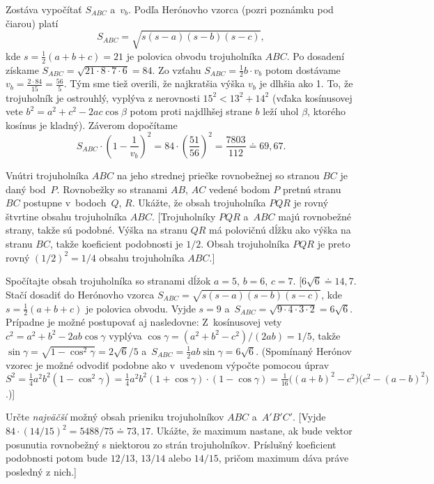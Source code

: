 {Zostáva vypočítať $S_{ABC}$ a~$v_b$.
Podľa Herónovho vzorca (pozri poznámku pod čiarou)
platí
$$S_{ABC}=\sqrt{s(s-a)(s-b)(s-c)},
$$
kde $s=\frac12(a+b+c)=21$ je polovica obvodu trojuholníka $ABC$.
Po dosadení získame
$S_{ABC}=\sqrt{21\cdot8\cdot7\cdot6}=84$.
Zo vzťahu $S_{ABC}=\frac12b\cdot v_b$ potom dostávame $v_b=\frac{2\cdot 84}{15}=\frac{56}{5}$.
Tým sme tiež overili, že najkratšia výška $v_b$ je dlhšia ako 1. To, že trojuholník je ostrouhlý, vyplýva z nerovnosti $15^2<13^2+14^2$ (vďaka kosínusovej vete $b^2=a^2+c^2-2ac\cos\beta$ potom proti najdlhšej strane $b$ leží uhol $\beta$, ktorého kosínus je kladný).
Záverom dopočítame
$$
S_{ABC}\cdot \left(1-\frac1{v_b}\right)^2 = 84\cdot \left(\frac{51}{56}\right)^2 = \frac{7803}{112} \doteq 69{,}67.
$$


Vnútri trojuholníka $ABC$ na jeho strednej priečke rovnobežnej so stranou $BC$ je daný bod~$P$. Rovnobežky so stranami $AB$, $AC$ vedené bodom $P$ pretnú stranu~$BC$ postupne v~bodoch~$Q$, $R$. Ukážte, že obsah trojuholníka $PQR$ je rovný štvrtine obsahu trojuholníka $ABC$.
 [Trojuholníky $PQR$ a~$ABC$ majú rovnobežné strany, takže sú podobné. Výška na stranu $QR$ má polovičnú dĺžku ako výška na stranu $BC$, takže koeficient podobnosti je $1/2$. Obsah trojuholníka $PQR$ je preto rovný $(1/2)^2=1/4$ obsahu trojuholníka $ABC$.]

Spočítajte obsah trojuholníka so stranami dĺžok $a=5$, $b=6$, $c=7$.
 [$6\sqrt6\doteq 14{,}7$. Stačí dosadiť do Herónovho vzorca
 $S_{ABC}=\sqrt{s(s-a)(s-b)(s-c)}$, kde $s=\frac12{(a+b+c)}$ je polovica obvodu. Vyjde $s=9$ a~$S_{ABC}=\sqrt{9\cdot 4\cdot 3\cdot 2}=6\sqrt{6}$. Prípadne je možné postupovať aj nasledovne: Z~kosínusovej vety $c^2=a^2+b^2-2ab\cos\gamma$ vyplýva $\cos\gamma = {(a^2+b^2-c^2)}/(2ab) = 1/5$, takže $\sin\gamma=\sqrt{1-\cos^2\gamma}=2\sqrt{6}/5$ a~$S_{ABC}=\frac12ab \sin\gamma=6\sqrt{6}$.
 (Spomínaný Herónov vzorec je možné odvodiť podobne ako v~uvedenom výpočte pomocou úprav $S^2=\frac14a^2b^2(1-\cos^2\gamma) =\frac14a^2b^2(1+\cos\gamma) \cdot{(1-\cos\gamma)} = \frac1{16}\bigl((a+b)^2-c^2)(c^2-(a-b)^2\bigr)$.)]

\D
Určte {\it najväčší\/} možný obsah prieniku trojuholníkov $ABC$ a~$A'B'C'$. [Vyjde $84\cdot (14/15)^2=5488/75\doteq 73{,}17$.
Ukážte, že maximum nastane, ak bude vektor posunutia rovnobežný s niektorou zo strán trojuholníkov. Príslušný koeficient podobnosti potom bude $12/13$, $13/14$ alebo $14/15$, pričom maximum dáva práve posledný z nich.]

}
